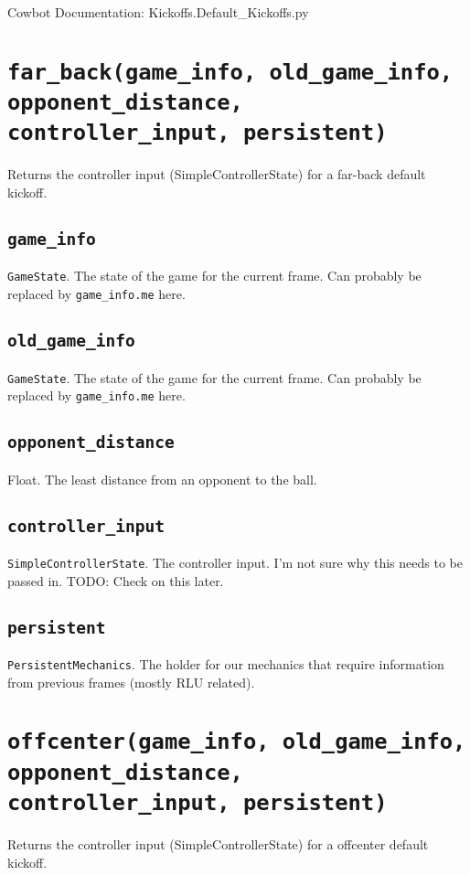 \documentclass{article}
\newcommand{\function}[1]{\section{\texttt{#1}}}
\newcommand{\argumenta}[1]{\subsection{\texttt{#1}}}
\begin{document}
\begin{flushleft}

\begin{center}
  Cowbot Documentation: Kickoffs.Default\_Kickoffs.py
\end{center}



\function{far\_back(game\_info, old\_game\_info, opponent\_distance, controller\_input, persistent)}
         {
           Returns the controller input (SimpleControllerState) for a far-back default kickoff.


           \argumenta{game\_info}
                     {
                       \texttt{GameState}.  The state of the game for the current frame.  Can probably be replaced by \texttt{game\_info.me} here.
                     }
           \argumenta{old\_game\_info}
                     {
                       \texttt{GameState}.  The state of the game for the current frame.  Can probably be replaced by \texttt{game\_info.me} here.
                     }
           \argumenta{opponent\_distance}
                     {
                       Float.  The least distance from an opponent to the ball.
                     }
           \argumenta{controller\_input}
                     {
                       \texttt{SimpleControllerState}.  The controller input.  I'm not sure why this needs to be passed in.  TODO: Check on this later.
                     }
           \argumenta{persistent}
                     {
                       \texttt{PersistentMechanics}.  The holder for our mechanics that require information from previous frames (mostly RLU related).
                     }
         }
         




\function{offcenter(game\_info, old\_game\_info, opponent\_distance, controller\_input, persistent)}
         {
           Returns the controller input (SimpleControllerState) for a offcenter default kickoff.


}
\end{flushleft}
\end{document}
